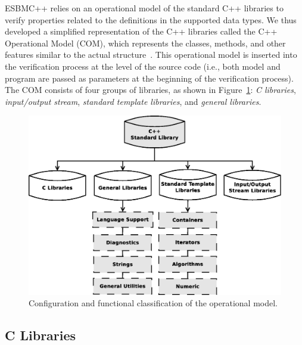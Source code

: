 \documentclass[a4paper]{llncs}
\begin{document}

ESBMC++ relies on an operational model of the standard C++ libraries to
verify properties related to the definitions in the supported data
types.  We thus developed a simplified representation of the C++
libraries called the C++ Operational Model (COM), which represents the
classes, methods, and other features similar to the actual
structure~\cite{CppReference12}.  This operational model is inserted
into the verification process at the level of the source code (i.e.,
both model and program are passed as parameters at the beginning of the
verification process). The COM consists of four groups of libraries, as
shown in Figure~\ref{figure:cpp-diagram}: \emph{C libraries},
\emph{input/output stream}, \emph{standard template libraries}, and
\emph{general libraries}.

\begin{figure}[ht] \centering
\includegraphics[scale=0.25]{figures/diagramascpp}
\caption{Configuration and functional classification of the operational model.}
\label{figure:cpp-diagram}
\end{figure}

\subsection{C Libraries}
\end{document}
